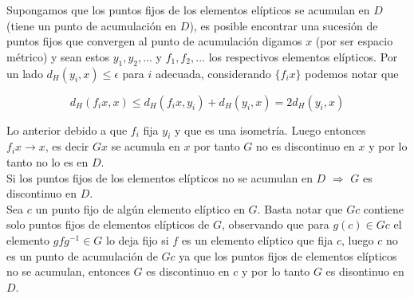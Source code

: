 Supongamos que los puntos fijos de los elementos el\'ipticos se
acumulan en $D$ (tiene un punto de acumulaci\'on en $D$), es posible
encontrar una sucesi\'on de puntos fijos que convergen al punto de
acumulaci\'on digamos $x$ (por ser espacio m\'etrico) y sean estos $y_{1},y_{2},...$ y
$f_{1},f_{2},...$ los respectivos elementos el\'ipticos. Por un lado
$d_{H}(y_{i},x) \leq \epsilon $ para $i$ adecuada, considerando $\lbrace
f_{i}x\rbrace$ podemos notar que

$$ d_{H}(f_{i}x,x) \leq d_{H}(f_{i}x,y_{i}) + d_{H}(y_{i},x) = 2d_{H}(y_{i},x)$$

Lo anterior debido a que $f_{i}$ fija $y_{i}$ y que es una
isometr\'ia. Luego entonces $f_{i}x \rightarrow x$, es decir $Gx$ se
acumula en $x$  por tanto $G$ no es discontinuo en $x$ y por lo
tanto no lo es en $D$.\\

Si los puntos fijos de los elementos el\'ipticos no se acumulan en $D$
$\Rightarrow$ $G$ es discontinuo en $D$.\\

Sea $c$ un punto fijo de alg\'un elemento el\'iptico en $G$. Basta notar que $Gc$ contiene solo puntos fijos de elementos el\'ipticos de $G$, observando que para $g(c) \in Gc$ el elemento $gfg^{-1} \in G$ lo deja fijo si $f $ es un elemento el\'iptico que fija $c$, luego $c$ no es un punto de acumulaci\'on de $Gc$ ya que los puntos fijos de elementos el\'ipticos no se acumulan, entonces $G$ es discontinuo en $c$ y por lo tanto $G$ es disontinuo en $D$.




